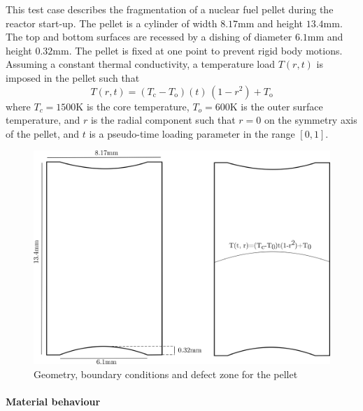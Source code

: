 This test case describes the fragmentation of a nuclear fuel pellet during the
reactor start-up.
The pellet is a cylinder of width $8.17$mm and height $13.4$mm.
The top and bottom surfaces are recessed by a dishing of diameter $6.1$mm and height $0.32$mm.
The pellet is fixed at one point to prevent rigid body motions.
Assuming a constant thermal conductivity, a temperature load $T(r, t)$ is imposed in the pellet such that
%
%
%
\begin{equation}
  T(r, t) = (T_{\mathrm{c}} - T_{\mathrm{o}}) (t) \, (1-r^{2}) + T_{\mathrm{o}}
\end{equation}
%
%
%
where $T_{c} = 1500$K is the core temperature, $T_{o} = 600$K is the outer surface temperature,
and $r$ is the radial component such that $r=0$ on the symmetry axis of the pellet, and $t$ is a
pseudo-time loading parameter in the range \([0,1]\).
%
%
%


\begin{figure}[H]
  \centering
  \includegraphics[width=10.cm]{../chapter_003_ef_micromorphic/drawings/pellet_mesh.png}
  \caption{Geometry, boundary conditions and defect zone for the pellet}
  \label{fig:micromorphic_damage:pellet_mesh}
\end{figure}

\paragraph{Material behaviour}

